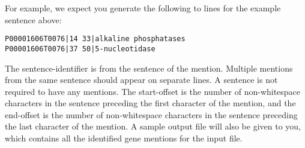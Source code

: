 For example, we expect you generate the following to lines for the example
sentence above:

\begin{verbatim}
P00001606T0076|14 33|alkaline phosphatases
P00001606T0076|37 50|5-nucleotidase
\end{verbatim}

The sentence-identifier is from the sentence of the mention. Multiple mentions
from the same sentence should appear on separate lines. A sentence is not
required to have any mentions. The start-offset is the number of non-whitespace
characters in the sentence preceding the first character of the mention, and the
end-offset is the number of non-whitespace characters in the sentence preceding
the last character of the mention. A sample output file will also be given to
you, which contains all the identified gene mentions for the input file.
